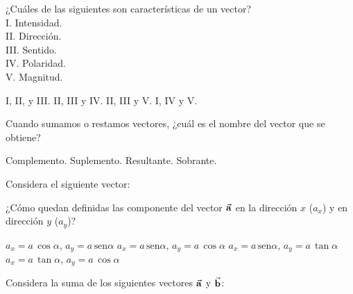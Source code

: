 \documentclass[14pt]{exam}
\begin{document}
\begin{questions}
    \question ¿Cuáles de las siguientes son características de un vector?
    \\[0.5em]
    I. Intensidad. \\
    II. Dirección. \\
    III. Sentido. \\
    IV. Polaridad. \\
    V. Magnitud. \\[0.5em]
    \begin{oneparchoices}
        \choice I, II, y III.
        \choice II, III y IV.
        \choice II, III y V.
        \choice I, IV y V.
    \end{oneparchoices}
    \question Cuando sumamos o restamos vectores, ¿cuál es el nombre del vector que se obtiene?
    \\[0.5em]
    \begin{oneparchoices}
        \choice Complemento.
        \choice Suplemento.
        \choice Resultante.
        \choice Sobrante.
    \end{oneparchoices}
    \question Considera el siguiente vector:
    \begin{figure}[H]
        \centering
    \end{figure}
    ¿Cómo quedan definidas las componente del vector $\va{a}$ en la dirección $x$ ($a_{x}$) y en dirección $y$ ($a_{y}$)?
    \begin{choices}
        \choice $a_{x} = a \, \cos \alpha$, $a_{y} = a \, \text{sen} \alpha$
        \choice $a_{x} = a \, \text{sen} \alpha$, $a_{y} = a \, \cos \alpha$
        \choice $a_{x} = a \, \text{sen} \alpha$, $a_{y} = a \, \tan \alpha$
        \choice $a_{x} = a \, \tan \alpha$, $a_{y} = a \, \cos \alpha$
    \end{choices}
    \question Considera la suma de los siguientes vectores $\va{a}$ y $\va{b}$:
    \begin{figure}[H]
        \centering
\end{figure}
\end{questions}
\end{document}
